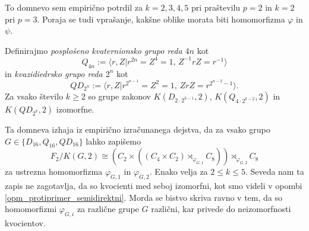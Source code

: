 To domnevo sem empirično potrdil za $k = 2, 3, 4, 5$ pri praštevilu $p = 2$ in $k = 2$ pri $p = 3$. Poraja se tudi vprašanje, kakšne oblike morata biti homomorfizma $\varphi$ in $\psi$.

\begin{domneva}
    Definirajmo \emph{posplošeno kvaternionsko grupo reda $4n$}  kot \begin{equation*}
        Q_{4n} := \langle r, Z \vert r^{2n} = Z^4 = 1, \, Z^{-1} r Z = r^{-1} \rangle
    \end{equation*}
    in \emph{kvazidiedrsko grupo reda $2^n$} kot \begin{equation*}
        QD_{2^n} := \langle r, Z \vert r^{2^{n -1}} = Z^2 = 1, \, Z r Z = r^{2^{n -2} -1} \rangle.
    \end{equation*}
    Za vsako število $k \ge 2$ so grupe zakonov $K(D_{2 \cdot 2^{k-1}}, 2)$, $K(Q_{4 \cdot 2^{k-2}}, 2)$ in $K(QD_{2^{k}}, 2)$ izomorfne. 
\end{domneva}

Ta domneva izhaja iz empirično izračunanega dejstva, da za vsako grupo $G \in \{ D_{16}, Q_{16}, QD_{16} \}$ lahko zapišemo \begin{equation*}
    F_2 / K(G, 2) \cong (C_2 \times ((C_4 \times C_2) \rtimes_{\varphi_{G, 1}} C_8)) \rtimes_{\varphi_{G, 2}} C_8
\end{equation*} 
za ustrezna homomorfizma $\varphi_{G, 1}$ in $\varphi_{G, 2}$. Enako velja za $2 \le k \le 5$.
Seveda nam ta zapis ne zagotavlja, da so kvocienti med seboj izomorfni, kot smo videli v opombi \ref{opm_protiprimer_semidirektni}.
Morda se bistvo skriva ravno v tem, da so homomorfizmi $\varphi_{G, i}$ za različne grupe $G$ različni, kar privede do neizomorfnosti kvocientov. 



